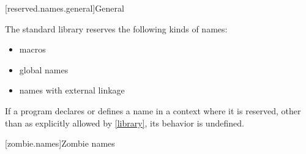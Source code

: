 [reserved.names.general]{General}%

\pnum
The \Cpp{} standard library reserves the following kinds of names:
\begin{itemize}
\item macros
\item global names
\item names with external linkage
\end{itemize}

\pnum
If a program declares or defines a name in a context where it is
reserved, other than as explicitly allowed by \ref{library}, its behavior is
undefined.%

[zombie.names]{Zombie names}%
%
%
%

